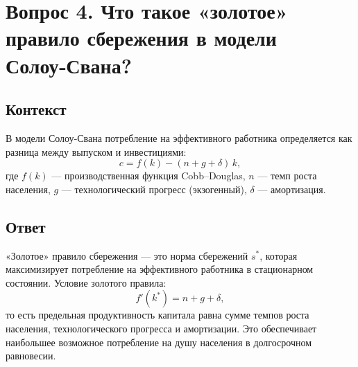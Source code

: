 \section*{Вопрос 4. Что такое «золотое» правило сбережения в модели Солоу‑Свана?}

\subsection*{Контекст}
В модели Солоу‑Свана потребление на эффективного работника определяется как разница между выпуском и инвестициями:
\[
c = f(k) - (n + g + \delta)\,k,
\]
где \(f(k)\) — производственная функция Cobb–Douglas, \(n\) — темп роста населения, \(g\) — технологический прогресс (экзогенный), 
\(\delta\) — амортизация.

\subsection*{Ответ}
«Золотое» правило сбережения — это норма сбережений \(s^*\), которая максимизирует потребление на 
эффективного работника в стационарном состоянии. Условие золотого правила:
\[
f'(k^*) = n + g + \delta,
\]
то есть предельная продуктивность капитала равна сумме темпов роста населения, технологического прогресса и амортизации. 
Это обеспечивает наибольшее возможное потребление на душу населения в долгосрочном равновесии.
